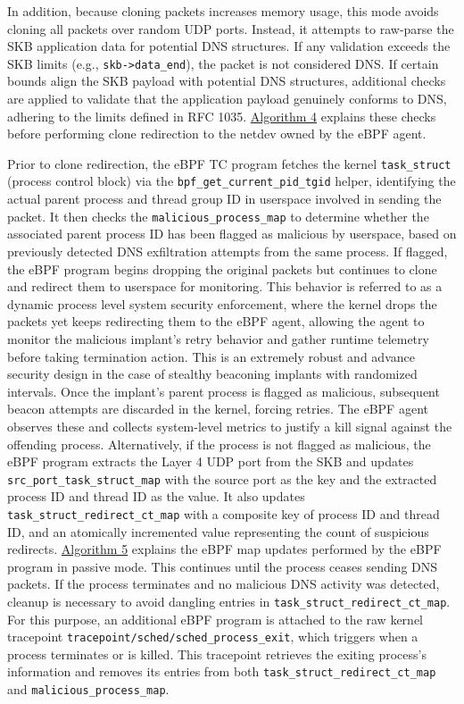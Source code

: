 \documentclass [11pt, proquest] {uwthesis}[2020/02/24]
\begin{document}
In addition, because cloning packets increases memory usage, this mode avoids cloning all packets over random UDP ports. Instead, it attempts to raw-parse the SKB application data for potential DNS structures. If any validation exceeds the SKB limits (e.g., \texttt{skb->data\_end}), the packet is not considered DNS. If certain bounds align the SKB payload with potential DNS structures, additional checks are applied to validate that the application payload genuinely conforms to DNS, adhering to the limits defined in RFC 1035. \hyperref[sec:alg4]{Algorithm 4} explains these checks before performing clone redirection to the netdev owned by the eBPF agent.

Prior to clone redirection, the eBPF TC program fetches the kernel \texttt{task\_struct} (process control block) via the \texttt{bpf\_get\_current\_pid\_tgid} helper, identifying the actual parent process and thread group ID in userspace involved in sending the packet. It then checks the \texttt{malicious\_process\_map} to determine whether the associated parent process ID has been flagged as malicious by userspace, based on previously detected DNS exfiltration attempts from the same process. If flagged, the eBPF program begins dropping the original packets but continues to clone and redirect them to userspace for monitoring. This behavior is referred to as a dynamic process level system security enforcement, where the kernel drops the packets yet keeps redirecting them to the eBPF agent, allowing the agent to monitor the malicious implant’s retry behavior and gather runtime telemetry before taking termination action. This is an extremely robust and advance security design in the case of stealthy beaconing implants with randomized intervals. Once the implant’s parent process is flagged as malicious, subsequent beacon attempts are discarded in the kernel, forcing retries. The eBPF agent observes these and collects system-level metrics to justify a kill signal against the offending process. Alternatively, if the process is not flagged as malicious, the eBPF program extracts the Layer 4 UDP port from the SKB and updates \texttt{src\_port\_task\_struct\_map} with the source port as the key and the extracted process ID and thread ID as the value. It also updates \texttt{task\_struct\_redirect\_ct\_map} with a composite key of process ID and thread ID, and an atomically incremented value representing the count of suspicious redirects. \hyperref[sec:alg5]{Algorithm 5} explains the eBPF map updates performed by the eBPF program in passive mode.
This continues until the process ceases sending DNS packets. If the process terminates and no malicious DNS activity was detected, cleanup is necessary to avoid dangling entries in \texttt{task\_struct\_redirect\_ct\_map}. For this purpose, an additional eBPF program is attached to the raw kernel tracepoint \texttt{tracepoint/sched/sched\_process\_exit}, which triggers when a process terminates or is killed. This tracepoint retrieves the exiting process’s information and removes its entries from both \texttt{task\_struct\_redirect\_ct\_map} and \texttt{malicious\_process\_map}.
\end{document}

